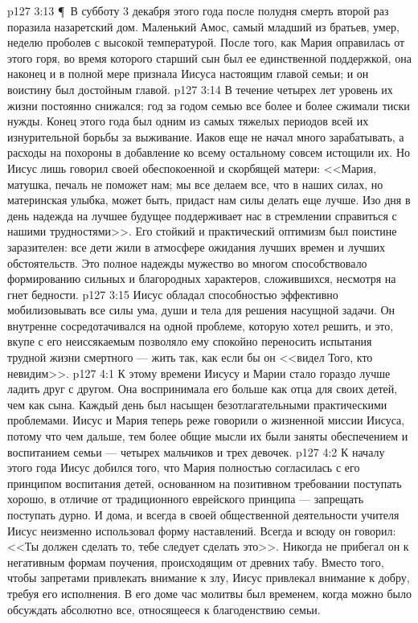 \vs p127 3:13 \P\ В субботу 3 декабря этого года после полудня смерть второй раз поразила назаретский дом. Маленький Амос, самый младший из братьев, умер, неделю проболев с высокой температурой. После того, как Мария оправилась от этого горя, во время которого старший сын был ее единственной поддержкой, она наконец и в полной мере признала Иисуса настоящим главой семьи; и он воистину был достойным главой.
\vs p127 3:14 В течение четырех лет уровень их жизни постоянно снижался; год за годом семью все более и более сжимали тиски нужды. Конец этого года был одним из самых тяжелых периодов всей их изнурительной борьбы за выживание. Иаков еще не начал много зарабатывать, а расходы на похороны в добавление ко всему остальному совсем истощили их. Но Иисус лишь говорил своей обеспокоенной и скорбящей матери: <<Мария, матушка, печаль не поможет нам; мы все делаем все, что в наших силах, но материнская улыбка, может быть, придаст нам силы делать еще лучше. Изо дня в день надежда на лучшее будущее поддерживает нас в стремлении справиться с нашими трудностями>>. Его стойкий и практический оптимизм был поистине заразителен: все дети жили в атмосфере ожидания лучших времен и лучших обстоятельств. Это полное надежды мужество во многом способствовало формированию сильных и благородных характеров, сложившихся, несмотря на гнет бедности.
\vs p127 3:15 Иисус обладал способностью эффективно мобилизовывать все силы ума, души и тела для решения насущной задачи. Он внутренне сосредотачивался на одной проблеме, которую хотел решить, и это, вкупе с его неиссякаемым  позволяло ему спокойно переносить испытания трудной жизни смертного --- жить так, как если бы он <<видел Того, кто невидим>>.
\vs p127 4:1 К этому времени Иисусу и Марии стало гораздо лучше ладить друг с другом. Она воспринимала его больше как отца для своих детей, чем как сына. Каждый день был насыщен безотлагательными практическими проблемами. Иисус и Мария теперь реже говорили о жизненной миссии Иисуса, потому что чем дальше, тем более общие мысли их были заняты обеспечением и воспитанием семьи --- четырех мальчиков и трех девочек.
\vs p127 4:2 К началу этого года Иисус добился того, что Мария полностью согласилась с его принципом воспитания детей, основанном на позитивном требовании поступать хорошо, в отличие от традиционного еврейского принципа --- запрещать поступать дурно. И дома, и всегда в своей общественной деятельности учителя Иисус неизменно использовал  форму наставлений. Всегда и всюду он говорил: <<Ты должен сделать то, тебе следует сделать это>>. Никогда не прибегал он к негативным формам поучения, происходящим от древних табу. Вместо того, чтобы запретами привлекать внимание к злу, Иисус привлекал внимание к добру, требуя его исполнения. В его доме час молитвы был временем, когда можно было обсуждать абсолютно все, относящееся к благоденствию семьи.

